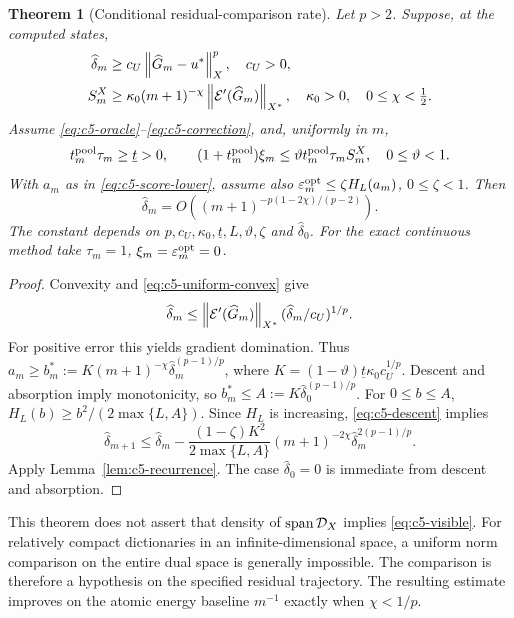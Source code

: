 \documentclass[11pt]{article}
\newtheorem{theorem}{Theorem}[section]
\theoremstyle{remark}
\begin{document}
\begin{theorem}[Conditional residual-comparison rate]
\label{thm:c5-visible}
Let $p>2$. Suppose, at the computed states,
\begin{align}
 \widehat\delta_m&\geq c_U\left\lVert\widehat G_m-u^*\right\rVert_X^p,\quad c_U>0,
 \label{eq:c5-uniform-convex}\\
 S_m^X&\geq\kappa_0(m+1)^{-\chi}
                   \left\lVert\mathcal E'(\widehat G_m)\right\rVert_{X^*},
 \quad\kappa_0>0,\quad0\leq\chi<\tfrac12 .
 \label{eq:c5-visible}
\end{align}
Assume \eqref{eq:c5-oracle}--\eqref{eq:c5-correction}, and, uniformly in $m$,
\[
 t_m^{\rm pool}\tau_m\geq\underline t>0,\qquad
 (1+t_m^{\rm pool})\xi_m
 \leq\vartheta t_m^{\rm pool}\tau_m S_m^X,\quad0\leq\vartheta<1 .
\]
With $a_m$ as in \eqref{eq:c5-score-lower}, assume also
$\varepsilon_m^{\rm opt}\leq\zeta H_L(a_m)$, $0\leq\zeta<1$.
Then
\begin{equation}
 \widehat\delta_m=O((m+1)^{-p(1-2\chi)/(p-2)}) .
 \label{eq:c5-visible-rate}
\end{equation}
The constant depends on $p,c_U,\kappa_0,\underline t,L,\vartheta,\zeta$ and
$\widehat\delta_0$. For the exact continuous method take
$\tau_m=1$, $\xi_m=\varepsilon_m^{\rm opt}=0$.
\end{theorem}
\begin{proof}
Convexity and \eqref{eq:c5-uniform-convex} give
\[
 \widehat\delta_m\leq
 \left\lVert\mathcal E'(\widehat G_m)\right\rVert_{X^*}
       (\widehat\delta_m/c_U)^{1/p}.
\]
For positive error this yields gradient domination.
Thus $a_m\geq b_m^*:=K(m+1)^{-\chi}
\widehat\delta_m^{(p-1)/p}$, where
$K=(1-\vartheta)\underline t\kappa_0c_U^{1/p}$.
Descent and absorption imply monotonicity, so
$b_m^*\leq A:=K\widehat\delta_0^{(p-1)/p}$.
For $0\leq b\leq A$,
$H_L(b)\geq b^2/(2\max\{L,A\})$.
Since $H_L$ is increasing, \eqref{eq:c5-descent} implies
\[
 \widehat\delta_{m+1}\leq\widehat\delta_m-
 \frac{(1-\zeta)K^2}{2\max\{L,A\}}
 (m+1)^{-2\chi}\widehat\delta_m^{2(p-1)/p}.
\]
Apply Lemma~\ref{lem:c5-recurrence}. The case $\widehat\delta_0=0$
is immediate from descent and absorption.
\end{proof}

This theorem does not assert that density of $\operatorname{span}\mathcal D_X$
implies \eqref{eq:c5-visible}. For relatively compact dictionaries in an
infinite-dimensional space, a uniform norm comparison on the entire dual
space is generally impossible. The comparison is therefore a hypothesis on
the specified residual trajectory. The resulting estimate improves on the
atomic energy baseline $m^{-1}$ exactly when $\chi<1/p$.
\end{document}

